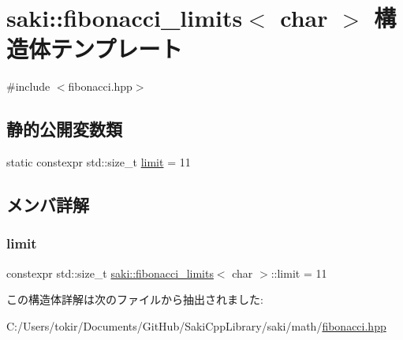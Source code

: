 \hypertarget{structsaki_1_1fibonacci__limits_3_01char_01_4}{}\section{saki\+:\+:fibonacci\+\_\+limits$<$ char $>$ 構造体テンプレート}
\label{structsaki_1_1fibonacci__limits_3_01char_01_4}


{\ttfamily \#include $<$fibonacci.\+hpp$>$}

\subsection*{静的公開変数類}
\begin{DoxyCompactItemize}
\item 
static constexpr std\+::size\+\_\+t \mbox{\hyperlink{structsaki_1_1fibonacci__limits_3_01char_01_4_a61bce7b1ef85d9bcb5d5dd340f7ccc97}{limit}} = 11
\end{DoxyCompactItemize}


\subsection{メンバ詳解}
\mbox{\label{structsaki_1_1fibonacci__limits_3_01char_01_4_a61bce7b1ef85d9bcb5d5dd340f7ccc97}} 
\subsubsection{\texorpdfstring{limit}{limit}}
{\footnotesize\ttfamily constexpr std\+::size\+\_\+t \mbox{\hyperlink{structsaki_1_1fibonacci__limits}{saki\+::fibonacci\+\_\+limits}}$<$ char $>$\+::limit = 11\hspace{0.3cm}{\ttfamily [static]}}



この構造体詳解は次のファイルから抽出されました\+:\begin{DoxyCompactItemize}
\item 
C\+:/\+Users/tokir/\+Documents/\+Git\+Hub/\+Saki\+Cpp\+Library/saki/math/\mbox{\hyperlink{fibonacci_8hpp}{fibonacci.\+hpp}}\end{DoxyCompactItemize}
